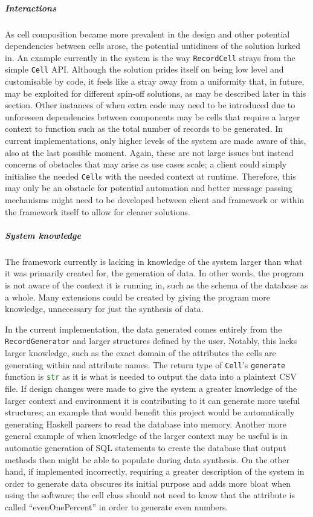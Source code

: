 \subparagraph{Interactions} As cell composition became more prevalent
in the design and other potential dependencies between cells arose, the potential
untidiness of the solution lurked in. An example currently in the system is the
way \lstinline{RecordCell} strays from the simple \lstinline{Cell} API. Although
the solution prides itself on being low level and customisable by code, it
feels like a stray away from a uniformity that, in future, may be exploited for
different spin-off solutions, as may be described later in this section. Other
instances of when extra code may need to be introduced due to unforeseen
dependencies between components may be cells that require a larger context to
function such as
the total number of records to be generated. In current implementations, only
higher levels of the system are made aware of this, also at the last possible
moment. Again, these are not large issues but instead concerns of obstacles that
may arise as
use cases scale; a client could simply initialise the needed
\lstinline{Cell}s with the needed context at runtime. Therefore, this may only
be an obstacle for potential automation and better message passing mechanisms
might need to be developed between client and framework or within the framework
itself to allow for cleaner solutions.

\subparagraph{System knowledge} The framework currently is lacking in knowledge
of the system larger than what it was primarily created for, the generation of
data. In other words, the program is not aware of the context it is running in,
such as the schema of the database as a whole. Many extensions could be created
by giving the program more knowledge, unnecessary for just the synthesis of
data.

In the current implementation, the data generated comes entirely from the
\lstinline{RecordGenerator} and larger structures defined by the user. Notably,
this lacks larger knowledge, such as the exact domain of the attributes the
cells are generating within and attribute names. The return type of \lstinline{Cell}'s
\lstinline{generate} function is \lstinline[language=Python]{str} as it is what
is needed to output the data into a plaintext CSV file. If design changes
were made to give the system a greater knowledge of the larger context and
environment it is contributing to it can generate more useful structures; an
example that would benefit this project would be automatically generating
Haskell parsers to read the database into memory. Another more general example of when
knowledge of the larger context may be useful is in automatic generation of SQL
statements to create the database that output methods then might be able to
populate during data synthesis. On the other hand, if implemented incorrectly,
requiring a greater description of the system in order to generate data obscures
its initial purpose and adds more bloat when using the software; the cell class
should not need to know that the attribute is called ``evenOnePercent'' in order
to generate even numbers.

